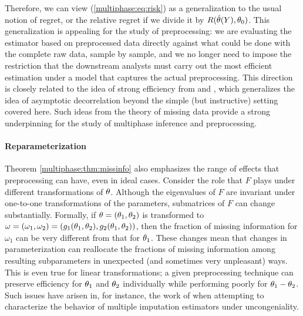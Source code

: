 Therefore, we can view (\ref{multiphase:eq:risk}) as a generalization to the usual notion of regret, or the relative regret if we divide it by $R(\hat{\theta}(Y), \theta_0)$. This generalization is appealing for the study of preprocessing: we are evaluating the estimator based on preprocessed data directly against what could be done with the complete raw data, sample by sample, and we no longer need to impose the restriction that the downstream analysts must carry out the most efficient estimation under a model that captures the actual preprocessing. This direction is closely related to the idea of strong efficiency from \cite{Xie2012} and \cite{Meng2012}, which generalizes the idea of asymptotic decorrelation beyond the simple (but instructive) setting covered here.
Such ideas from the theory of missing data provide a strong underpinning for the study of multiphase inference and preprocessing.

\paragraph{Reparameterization}
Theorem \ref{multiphase:thm:missinfo} also emphasizes the range of effects that preprocessing can have, even in ideal cases.
Consider the role that $F$ plays under different transformations of $\theta$.
Although the eigenvalues of $F$ are invariant under one-to-one transformations of the parameters, submatrices of $F$ can change substantially.
Formally, if $\theta = (\theta_1, \theta_2)$ is transformed to $\omega = (\omega_1, \omega_2) = (g_1(\theta_1, \theta_2), g_2(\theta_1, \theta_2))$, then the fraction of missing information for $\omega_1$ can be very different from that for $\theta_1$.
These changes mean that changes in parameterization can reallocate the fractions of missing information among resulting subparameters in unexpected (and sometimes very unpleasant) ways.
This is even true for linear transformations; a given preprocessing technique can preserve efficiency for $\theta_1$ and $\theta_2$ individually while performing poorly for $\theta_1 - \theta_2$.
Such issues have arisen in, for instance, the work of \cite{Xie2012} when attempting to characterize the behavior of multiple imputation estimators under uncongeniality.

